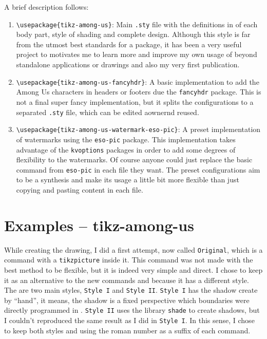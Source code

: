 \documentclass[12pt]{article}
\newenvironment{FHZtcbEnumerate}{%
  \begin{FHZboxEnumerateStyle}\begin{enumerate}}
    {\end{enumerate}\end{FHZboxEnumerateStyle}
}
\begin{document}
A brief description follows:
\begin{FHZtcbEnumerate}
  \item \verb|\usepackage{tikz-among-us}|: Main \texttt{.sty} file with the definitions in {\TikZ} of each body part, style of shading and complete design. Although this style is far from the utmost best standards for a {\TikZ} package, it has been a very useful project to motivates me to learn more and improve my own usage of {\TikZ} beyond standalone applications or drawings and also my very first {\CTAN} publication.

  \item \verb|\usepackage{tikz-among-us-fancyhdr}|: A basic implementation to add the Among Us characters in headers or footers due the \texttt{fancyhdr} package. This is not a final super fancy implementation, but it splits the configurations to a separated \texttt{.sty} file, which can be edited aownernd reused.

  \item \verb|\usepackage{tikz-among-us-watermark-eso-pic}|: A preset implementation of watermarks using the \texttt{eso-pic} package. This implementation takes advantage of the \texttt{kvoptions} packages in order to add some degrees of flexibility to the watermarks. Of course anyone could just replace the basic command from \texttt{eso-pic} in each file they want. The preset configurations aim to be a synthesis and make its usage a little bit more flexible than just copying and pasting content in each file.
\end{FHZtcbEnumerate}

\section{Examples -- tikz-among-us}

While creating the drawing, I did a first attempt, now called \texttt{Original}, which is a command with a \texttt{tikzpicture} inside it. This command was not made with the best method to be flexible, but it is indeed very simple and direct. I chose to keep it as an alternative to the new commands and because it has a different style.
The are two main styles, \texttt{Style I} and \texttt{Style II}. \texttt{Style I} has the shadow create by ``hand'', it means, the shadow is a fixed perspective which boundaries were directly programmed in {\TikZ}. \texttt{Style II} uses the library \texttt{shade} to create shadows, but I couldn't reproduced the same result as I did in \texttt{Style I}.
In this sense, I chose to keep both styles and using the roman number as a suffix of each command.
\end{document}
